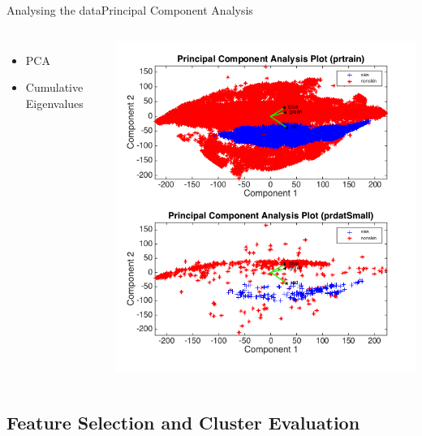 \documentclass{beamer}
\begin{document}
\begin{frame}{Analysing the data}{Principal Component Analysis}
    \begin{columns}
    \begin{itemize}
        \item PCA
        \item Cumulative Eigenvalues
        
        
    \end{itemize}
        \includegraphics[scale=0.25]{pcaplot2.png}
    \end{columns}
\end{frame}

\subsection{Feature Selection and Cluster Evaluation}
\end{document}
